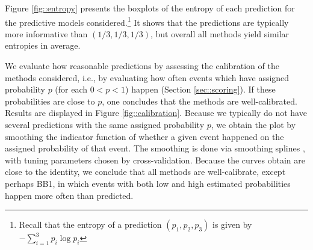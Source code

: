 \documentclass[journal,article,accept,moreauthors,pdftex,12pt,a4paper]{mdpi}
\begin{document}
Figure \ref{fig::entropy} presents the boxplots of the entropy of each prediction for the predictive models considered.\footnote{Recall
that the entropy of a prediction $(p_1,p_2,p_3)$ is given by $- \sum_{i=1}^3 p_i \log{p_i}$} It shows that the predictions
are typically more informative than $(1/3,1/3,1/3)$, but overall all methods yield similar entropies in average.

We evaluate how reasonable
predictions  by assessing the calibration of the methods considered,
i.e., by evaluating how often events which have assigned probability $p$ (for each $0<p<1$) happen (Section \ref{sec::scoring}).
If these probabilities are close to $p$, one concludes that the methods are well-calibrated. 
Results are displayed in Figure \ref{fig::calibration}.
Because we typically do not have several
predictions with the same assigned probability $p$, we obtain the plot by smoothing the indicator function of whether
a given event happened on  the assigned  probability of that event. The smoothing is done via smoothing splines 
\cite{wahba}, with tuning parameters chosen by cross-validation.
Because the curves obtain are close to the identity, we conclude that all methods are well-calibrate, except perhaps BB1, in which events with both low and high estimated probabilities happen more often 
than predicted.
\end{document}
